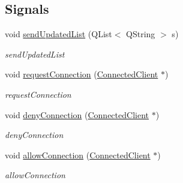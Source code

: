 \subsection*{Signals}
\begin{DoxyCompactItemize}
\item 
void \hyperlink{classPenguinServer_1_1ConnectedClient_a9040ba0b51fb32e9bf8736aaa6e59b4d}{send\-Updated\-List} (Q\-List$<$ Q\-String $>$ s)
\begin{DoxyCompactList}\small\item\em send\-Updated\-List \end{DoxyCompactList}\item 
\hypertarget{classPenguinServer_1_1ConnectedClient_af4082cf1b1b69c21fbdec855d951f910}{void \hyperlink{classPenguinServer_1_1ConnectedClient_af4082cf1b1b69c21fbdec855d951f910}{request\-Connection} (\hyperlink{classPenguinServer_1_1ConnectedClient}{Connected\-Client} $\ast$)}\label{classPenguinServer_1_1ConnectedClient_af4082cf1b1b69c21fbdec855d951f910}

\begin{DoxyCompactList}\small\item\em request\-Connection \end{DoxyCompactList}\item 
\hypertarget{classPenguinServer_1_1ConnectedClient_a10f32c661b8146c904b111aa347f37cb}{void \hyperlink{classPenguinServer_1_1ConnectedClient_a10f32c661b8146c904b111aa347f37cb}{deny\-Connection} (\hyperlink{classPenguinServer_1_1ConnectedClient}{Connected\-Client} $\ast$)}\label{classPenguinServer_1_1ConnectedClient_a10f32c661b8146c904b111aa347f37cb}

\begin{DoxyCompactList}\small\item\em deny\-Connection \end{DoxyCompactList}\item 
\hypertarget{classPenguinServer_1_1ConnectedClient_acec0bf4652332010b498ca5cfcc29627}{void \hyperlink{classPenguinServer_1_1ConnectedClient_acec0bf4652332010b498ca5cfcc29627}{allow\-Connection} (\hyperlink{classPenguinServer_1_1ConnectedClient}{Connected\-Client} $\ast$)}\label{classPenguinServer_1_1ConnectedClient_acec0bf4652332010b498ca5cfcc29627}

\begin{DoxyCompactList}\small\item\em allow\-Connection \end{DoxyCompactList}\end{DoxyCompactItemize}
